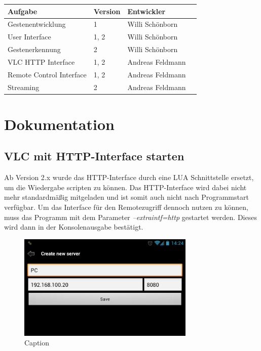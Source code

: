 \documentclass[a4paper,12pt]{article}
\begin{document}
\begin{table}[h!b!p!]
\begin{tabular*}{\textwidth}{ l l l l }
	\toprule
\textbf{Aufgabe} & \textbf{Version} & \textbf{Entwickler} \\
	\midrule
	Gestenentwicklung & 1 & Willi Schönborn  \\ 
	User Interface & 1, 2 & Willi Schönborn \\
	Gestenerkennung & 2 & Willi Schönborn \\
	VLC HTTP Interface & 1, 2 & Andreas Feldmann \\
	Remote Control Interface & 1, 2 & Andreas Feldmann \\
	Streaming & 2 & Andreas Feldmann \\
	\bottomrule
\end{tabular*}
\end{table}

\newpage

\section{Dokumentation}
\subsection{VLC mit HTTP-Interface starten}
Ab Version 2.x wurde das HTTP-Interface durch eine LUA Schnittstelle ersetzt, um die Wiedergabe scripten zu können. Das HTTP-Interface wird dabei nicht mehr standardmäßig mitgeladen und ist somit auch nicht nach Programmstart verfügbar. Um das Interface für den Remotezugriff dennoch nutzen zu können,  muss das Programm mit dem Parameter \textit{--extraintf=http} gestartet werden. Dieses wird dann in der Konsolenausgabe bestätigt. \\

\begin{figure}[H]
\centering
\includegraphics[width=0.75\textwidth]{Screenshot_5.png}
\caption{Caption}
\end{figure}
\end{document}

